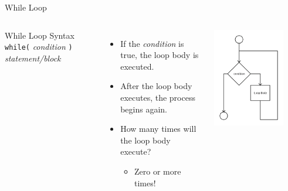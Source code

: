 \documentclass[]{beamer}
\begin{document}
\begin{frame}[fragile]{While Loop}
  \begin{columns}

    \begin{block}{While Loop Syntax}
      \verb!while(! \textit{condition} \verb!)! 
      \newline\verb!    ! \textit{statement/block}
    \end{block}
    
    \vspace{0.5cm}

    \begin{itemize}[<+(1)->]
      \item If the \textit{condition} is true, the loop body is executed.
      \item After the loop body executes, the process begins again.
      \item How many times will the loop body execute?
      \begin{itemize}
          \item Zero or more times!
      \end{itemize}
    \end{itemize}

    \begin{center}
      \includegraphics[width=0.8\textwidth]{images/while}
    \end{center}
  \end{columns}
\end{frame}
\end{document}
